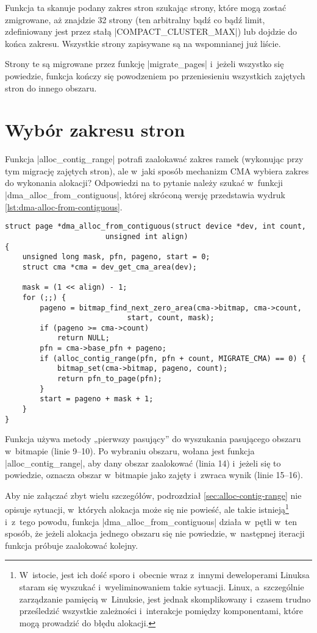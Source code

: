 Funkcja ta skanuje podany zakres stron szukając strony, które mogą
zostać zmigrowane, aż znajdzie 32 strony (ten arbitralny bądź co bądź
limit, zdefiniowany jest przez stałą \code|COMPACT_CLUSTER_MAX|) lub
dojdzie do końca zakresu.  Wszystkie strony zapisywane są na
wspomnianej już liście.

Strony te są migrowane przez funkcję \code|migrate_pages|
i~jeżeli wszystko się powiedzie, funkcja kończy się powodzeniem po
przeniesieniu wszystkich zajętych stron do innego obszaru.


\section{Wybór zakresu stron}\label{sec:alloc-from-contig}

Funkcja \code|alloc_contig_range| potrafi zaalokawać zakres ramek
(wykonując przy tym migrację zajętych stron), ale w~jaki sposób
mechanizm CMA wybiera zakres do wykonania alokacji?  Odpowiedzi na to
pytanie należy szukać w~funkcji \code|dma_alloc_from_contiguous|,
której skróconą wersję przedstawia wydruk
\ref{lst:dma-alloc-from-contiguous}.

\begin{lstlisting}[float=tbhp,caption={Skrócony wydruk funkcji
    \code|dma_alloc_from_contiguous| z Linuksa
    3.5.},label=lst:dma-alloc-from-contiguous]
struct page *dma_alloc_from_contiguous(struct device *dev, int count,
				       unsigned int align)
{
	unsigned long mask, pfn, pageno, start = 0;
	struct cma *cma = dev_get_cma_area(dev);

	mask = (1 << align) - 1;
	for (;;) {
		pageno = bitmap_find_next_zero_area(cma->bitmap, cma->count,
						    start, count, mask);
		if (pageno >= cma->count)
			return NULL;
		pfn = cma->base_pfn + pageno;
		if (alloc_contig_range(pfn, pfn + count, MIGRATE_CMA) == 0) {
			bitmap_set(cma->bitmap, pageno, count);
			return pfn_to_page(pfn);
		}
		start = pageno + mask + 1;
	}
}
\end{lstlisting}

Funkcja używa metody „pierwszy pasujący” do wyszukania pasującego
obszaru w~bitmapie (linie 9--10).  Po wybraniu obszaru, wołana jest
funkcja \code|alloc_contig_range|, aby dany obszar zaalokować
(linia 14) i~jeżeli się to powiedzie, oznacza obszar w~bitmapie jako
zajęty i~zwraca wynik (linie 15--16).

Aby nie załączać zbyt wielu szczegółów, podrozdział
\ref{sec:alloc-contig-range} nie opisuje sytuacji, w~których alokacja
może się nie powieść, ale takie istnieją\footnote{W~istocie, jest ich
  dość sporo i~obecnie wraz z~innymi deweloperami Linuksa staram się
  wyszukać i~wyeliminowaniem takie sytuacji.  Linux, a~szczególnie
  zarządzanie pamięcią w~Linuksie, jest jednak skomplikowany i~czasem
  trudno prześledzić wszystkie zależności i~interakcje pomiędzy
  komponentami, które mogą prowadzić do błędu alokacji.} i~z~tego
powodu, funkcja \code|dma_alloc_from_contiguous| działa w~pętli
w~ten sposób, że jeżeli alokacja jednego obszaru się nie powiedzie,
w~następnej iteracji funkcja próbuje zaalokować kolejny.


